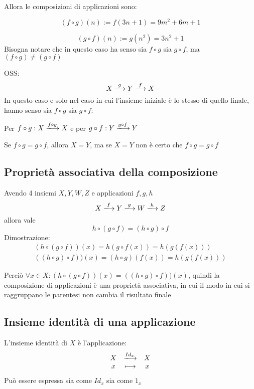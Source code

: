 \documentclass[a4paper,12pt]{article}
\begin{document}
	Allora le composizioni di applicazioni sono:
	
	\[
	(f \circ g)(n) := f(3n + 1) = 9m^2 + 6m + 1
	\]	
	
	\[
	(g \circ f)(n) := g(n^2) = 3n^2 + 1
	\]
	Bisogna notare che in questo caso ha senso sia $f \circ g$ sia $g \circ f$, ma $(f \circ g) \not = (g \circ f)$
	
	
	OSS: 
	\[
	X \xlongrightarrow{g} Y \xlongrightarrow{f} X
	\]
	In questo caso e solo nel caso in cui l'insieme iniziale è lo stesso di quello finale, hanno senso sia $f \circ g$ sia $g \circ f$:
	\begin{center}
		Per $f \circ g : X \xlongrightarrow{f \circ g} X$ e per $g \circ f : Y \xlongrightarrow{g \circ f} Y$
	\end{center}
	Se $f \circ g = g \circ f$, allora $X = Y$, ma se $X = Y$ non è certo che $f \circ g = g \circ f$
	
	\subsection{Proprietà associativa della composizione}
	
	Avendo 4 insiemi $X, Y, W, Z$ e applicazioni $f, g, h$
	\[
	X \xlongrightarrow{f} Y \xlongrightarrow{g} W \xlongrightarrow{h} Z
	\]
	allora vale
	\[
	h \circ (g \circ f) = (h \circ g) \circ f
	\]
	Dimostrazione:
	\begin{align}
		(h \circ (g \circ f))(x) = h(g \circ f(x)) = h(g(f(x))) \\
		((h \circ g) \circ f))(x) = (h \circ g)(f(x)) = h(g(f(x)))
	\end{align}
	
	Perciò $\forall x \in X: (h \circ (g \circ f))(x) = ((h \circ g) \circ f))(x)$, quindi la composizione di applicazioni è una proprietà associativa, in cui il modo in cui si raggruppano le parentesi non cambia il risultato finale
	
	\subsection{Insieme identità di una applicazione}
	L'insieme identità di $X$ è l'applicazione:
	\[
	\begin{array}{c c c}
		X & \xlongrightarrow{Id_x} & X \\
		x & \longmapsto & x \\
	\end{array}
	\]
	Può essere espressa sia come $Id_x$ sia come $1_x$
	
\end{document}
